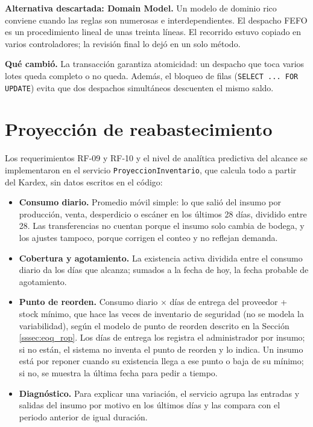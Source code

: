 \textbf{Alternativa descartada: Domain Model.} Un modelo de dominio rico conviene cuando las reglas son numerosas e interdependientes. El despacho FEFO es un procedimiento lineal de unas treinta líneas. El recorrido estuvo copiado en varios controladores; la revisión final lo dejó en un solo método.

\textbf{Qué cambió.} La transacción garantiza atomicidad: un despacho que toca varios lotes queda completo o no queda. Además, el bloqueo de filas (\texttt{SELECT ... FOR UPDATE}) evita que dos despachos simultáneos descuenten el mismo saldo.

\section{Proyección de reabastecimiento}
\label{sec:imp_proyeccion}

Los requerimientos RF-09 y RF-10 y el nivel de analítica predictiva del alcance se implementaron en el servicio \texttt{ProyeccionInventario}, que calcula todo a partir del Kardex, sin datos escritos en el código:

\begin{itemize}
    \item \textbf{Consumo diario.} Promedio móvil simple: lo que salió del insumo por producción, venta, desperdicio o escáner en los últimos 28 días, dividido entre 28. Las transferencias no cuentan porque el insumo solo cambia de bodega, y los ajustes tampoco, porque corrigen el conteo y no reflejan demanda.
    \item \textbf{Cobertura y agotamiento.} La existencia activa dividida entre el consumo diario da los días que alcanza; sumados a la fecha de hoy, la fecha probable de agotamiento.
    \item \textbf{Punto de reorden.} Consumo diario $\times$ días de entrega del proveedor + stock mínimo, que hace las veces de inventario de seguridad (no se modela la variabilidad), según el modelo de punto de reorden descrito en la Sección \ref{sssec:eoq_rop}. Los días de entrega los registra el administrador por insumo; si no están, el sistema no inventa el punto de reorden y lo indica. Un insumo está por reponer cuando su existencia llega a ese punto o baja de su mínimo; si no, se muestra la última fecha para pedir a tiempo.
    \item \textbf{Diagnóstico.} Para explicar una variación, el servicio agrupa las entradas y salidas del insumo por motivo en los últimos días y las compara con el periodo anterior de igual duración.
\end{itemize}

